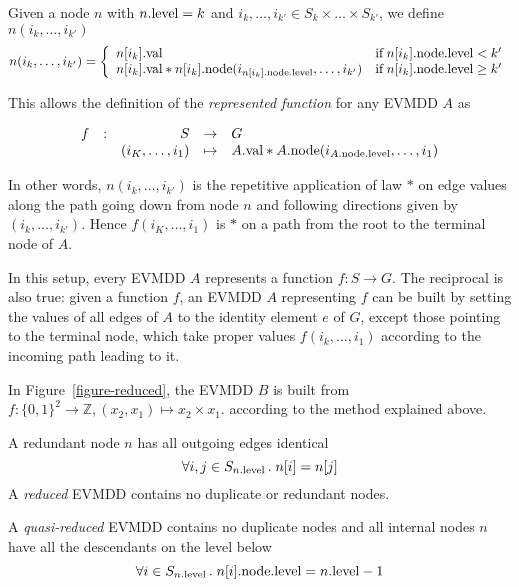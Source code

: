 \documentclass[a4paper,oneside,11pt,pdftex]{llncs}
\newcommand{\Z}{\mathbb{Z}}
\newcommand{\m}{\mbox}
\newcommand{\val}[1]{#1{\rm .val}}
\newcommand{\node}[1]{#1{\rm .node}}
\newcommand{\level}[1]{#1{\rm .level}}
\begin{document}
\begin{definition}
Given a node $n$ with $\level{n} = k$ and $i_k,\ldots, i_{k'} \in S_k \times \ldots \times S_{k'}$, we define $n(i_k, \ldots, i_{k'})$
$$
n(i_k,\ldots, i_{k'}) = \left\{
  \begin{array}{ll}
    \val{n[i_k]}&\m{if}\;\level{\node{n[i_k]}} < k'\\
    \val{n[i_k]} * \node{n[i_k]}(i_{\level{\node{n[i_k]}}},\ldots, i_{k'})&\m{if}\;\level{\node{n[i_k]}} \geq k'
  \end{array}
\right.
$$
\end{definition}

This allows the definition of the \emph{represented function} for any EVMDD $A$ as

$$
\begin{array}{lcrcl}
  f&:&S&\rightarrow&G\\
   & &(i_K,\ldots, i_1)&\mapsto&\val{A} * \node{A}(i_{\level{\node{A}}},\ldots, i_1)
\end{array}
$$

In other words, $n(i_k,\ldots, i_{k'})$ is the repetitive application of law $*$
on edge values along the path going down from node $n$ and following directions
given by $(i_k,\ldots, i_{k'})$. Hence $f(i_K,\ldots, i_1)$ is $*$ on a path from
the root to the terminal node of $A$.

In this setup, every EVMDD $A$ represents a function $f:S\rightarrow G$.
The reciprocal is also true: given a function $f$, an EVMDD $A$ representing
$f$ can be built by setting the values of all edges of $A$ to the identity element $e$
of $G$, except those pointing to the terminal node, which take proper values
$f(i_k,\ldots, i_1)$ according to the incoming path leading to it.

\begin{example}
In Figure~\vref{figure-reduced}, the EVMDD $B$ is built
from $f:\{0, 1\}^2\rightarrow\Z, (x_2, x_1)\mapsto x_2\times x_1$. according to the method explained above.
\end{example}

\begin{definition}\label{definition-reduced}
A redundant node $n$ has all outgoing edges identical
$$
\forall i, j \in S_{\level{n}}\,.\; n[i] = n[j]
$$
A \emph{reduced} EVMDD contains no duplicate or redundant nodes.
\end{definition}

\begin{definition}\label{definition-quasi-reduced}
A \emph{quasi-reduced} EVMDD contains no duplicate nodes and all internal nodes $n$ 
have all the descendants on the level below
$$
\forall i \in S_{\level{n}}\,.\; \level{\node{n[i]}} = \level{n}-1
$$
\end{definition}
\end{document}
